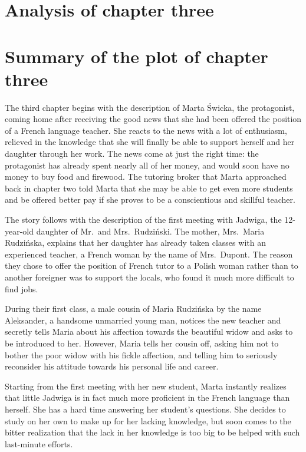 \section{Analysis of chapter three}
\section{Summary of the plot of chapter three}

The third chapter begins with the description of Marta Świcka, the protagonist, coming home after receiving the good news that she had been offered the position of a French language teacher.
She reacts to the news with a lot of enthusiasm, relieved in the knowledge that she will finally be able to support herself and her daughter through her work.
The news come at just the right time: the protagonist has already spent nearly all of her money, and would soon have no money to buy food and firewood.
The tutoring broker that Marta approached back in chapter two told Marta that she may be able to get even more students and be offered better pay if she proves to be a conscientious and skillful teacher.

The story follows with the description of the first meeting with Jadwiga, the 12-year-old daughter of Mr.\ and Mrs.\ Rudziński.
The mother, Mrs.\ Maria Rudzińska, explains that her daughter has already taken classes with an experienced teacher, a French woman by the name of Mrs.\ Dupont.
The reason they chose to offer the position of French tutor to a Polish woman rather than to another foreigner was to support the locals, who found it much more difficult to find jobs.

During their first class, a male cousin of Maria Rudzińska by the name Aleksander, a handsome unmarried young man, notices the new teacher and secretly tells Maria about his affection towards the beautiful widow and asks to be introduced to her.
However, Maria tells her cousin off, asking him not to bother the poor widow with his fickle affection, and telling him to seriously reconsider his attitude towards his personal life and career.

Starting from the first meeting with her new student, Marta instantly realizes that little Jadwiga is in fact much more proficient in the French language than herself.
She has a hard time answering her student's questions.
She decides to study on her own to make up for her lacking knowledge, but soon comes to the bitter realization that the lack in her knowledge is too big to be helped with such last-minute efforts.

